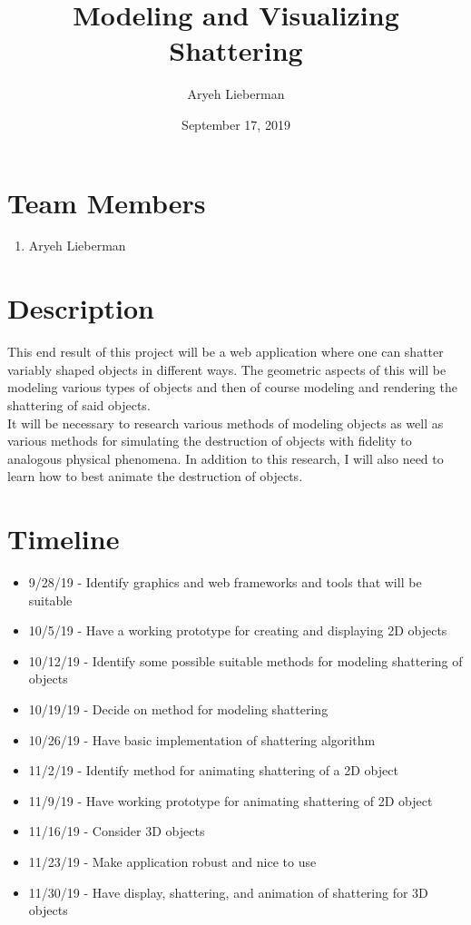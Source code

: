 \documentclass{article}
\author{Aryeh Lieberman}
\title{Modeling and Visualizing Shattering}
\date{September 17, 2019}
\begin{document}
\maketitle
\section{Team Members}
\begin{enumerate}
	\item Aryeh Lieberman
\end{enumerate}
\section{Description}
This end result of this project will be a web application where one can shatter variably shaped objects in different ways.  The geometric aspects of this will be modeling various types of objects and then of course modeling and rendering the shattering of said objects.\\
It will be necessary to research various methods of modeling objects as well as various methods for simulating the destruction of objects with fidelity to analogous physical phenomena.  In addition to this research, I will also need to learn how to best animate the destruction of objects.
\nocite{*}
\section{Timeline}
\begin{itemize}
	\item 9/28/19 - Identify graphics and web frameworks and tools that will be suitable
	\item 10/5/19 - Have a working prototype for creating and displaying 2D objects
	\item 10/12/19 - Identify some possible suitable methods for modeling shattering of objects
	\item 10/19/19 - Decide on method for modeling shattering
	\item 10/26/19 - Have basic implementation of shattering algorithm
	\item 11/2/19 - Identify method for animating shattering of a 2D object
	\item 11/9/19 - Have working prototype for animating shattering of 2D object
	\item 11/16/19 - Consider 3D objects
	\item 11/23/19 - Make application robust and nice to use
	\item 11/30/19 - Have display, shattering, and animation of shattering for 3D objects
\end{itemize}
{}

\end{document}
